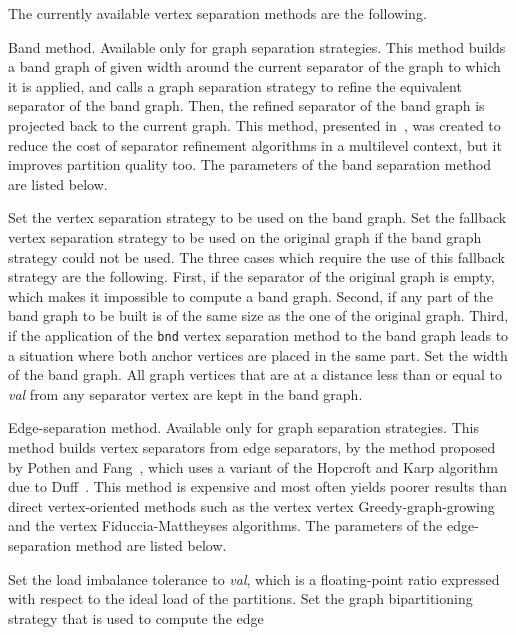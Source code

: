 The currently available vertex separation methods are the following.
\begin{itemize}
\iteme[{\tt b}]
Band method. Available only for graph separation strategies. This
method builds a band graph of given width around the current separator
of the graph to which it is applied, and calls a graph
separation strategy to refine the equivalent separator of the band
graph. Then, the refined separator of the band graph is projected back
to the current graph. This method, presented in~\cite{chpe06a}, was
created to reduce the cost of separator refinement algorithms in a
multilevel context, but it improves partition quality too.
The parameters of the band separation method are listed below.
\begin{itemize}
\iteme[{\tt bnd=}{\it strat}]
Set the vertex separation strategy to be used on the band graph.
\iteme[{\tt org=}{\it strat}]
Set the fallback vertex separation strategy to be used on the
original graph if the band graph strategy could not be used. The three
cases which require the use of this fallback strategy are the
following. First, if the separator of the original graph is empty,
which makes it impossible to compute a band graph. Second, if any part
of the band graph to be built is of the same size as the one of the
original graph. Third, if the application of the {\tt bnd}
vertex separation method to the band graph leads to a situation where both
anchor vertices are placed in the same part.
\iteme[{\tt width=}{\it val}]
Set the width of the band graph. All graph vertices that are at a
distance less than or equal to {\it val} from any separator vertex
are kept in the band graph.
\end{itemize}
\iteme[{\tt e}]
Edge-separation method. Available only for graph separation strategies.
This method builds vertex separators from edge separators, by the
method proposed by Pothen and Fang~\cite{pofa90}, which uses a variant
of the Hopcroft and Karp algorithm due to Duff~\cite{duff81}. This
method is expensive and most often yields poorer results than direct
vertex-oriented methods such as the vertex vertex Greedy-graph-growing
and the vertex Fiduccia-Mattheyses algorithms. The parameters of the
edge-separation method are listed below.
\begin{itemize}
\iteme[{\tt bal=}{\it val}]
Set the load imbalance tolerance to {\it val}, which is a floating-point
ratio expressed with respect to the ideal load of the partitions.
\iteme[{\tt strat=}{\it strat}]
Set the graph bipartitioning strategy that is used to compute the edge

\end{itemize}
\end{itemize}
